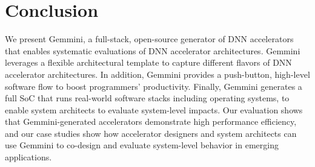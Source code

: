 \section{Conclusion}
We present Gemmini, a full-stack, open-source generator of DNN accelerators that
enables systematic evaluations of DNN accelerator architectures.
Gemmini leverages a flexible architectural template to capture
different flavors of DNN accelerator architectures.
In addition, Gemmini provides a push-button, high-level software flow to
boost programmers' productivity.
Finally, Gemmini generates a full SoC that runs real-world software stacks
including operating systems, to enable system architects to evaluate
system-level impacts. 
Our evaluation shows that Gemmini-generated accelerators demonstrate high performance efficiency, and  
our case studies show how accelerator designers and system architects can
use Gemmini to co-design and evaluate system-level behavior in emerging applications.
